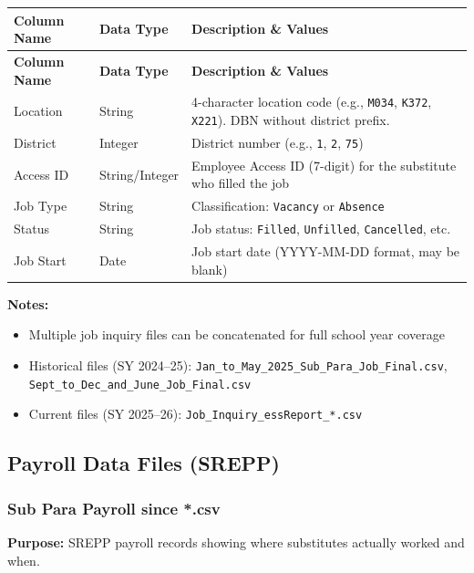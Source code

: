 \documentclass[12pt,letterpaper]{article}
\begin{document}
\begin{longtable}{p{3.5cm}p{2.5cm}p{7cm}}
\toprule
\textbf{Column Name} & \textbf{Data Type} & \textbf{Description \& Values} \\
\midrule
\endfirsthead
\toprule
\textbf{Column Name} & \textbf{Data Type} & \textbf{Description \& Values} \\
\midrule
\endhead
Location & String & 4-character location code (e.g., \texttt{M034}, \texttt{K372}, \texttt{X221}). DBN without district prefix. \\
\midrule
District & Integer & District number (e.g., \texttt{1}, \texttt{2}, \texttt{75}) \\
\midrule
Access ID & String/Integer & Employee Access ID (7-digit) for the substitute who filled the job \\
\midrule
Job Type & String & Classification: \texttt{Vacancy} or \texttt{Absence} \\
\midrule
Status & String & Job status: \texttt{Filled}, \texttt{Unfilled}, \texttt{Cancelled}, etc. \\
\midrule
Job Start & Date & Job start date (YYYY-MM-DD format, may be blank) \\
\bottomrule
\end{longtable}

\textbf{Notes:}
\begin{itemize}[leftmargin=*]
    \item Multiple job inquiry files can be concatenated for full school year coverage
    \item Historical files (SY 2024--25): \texttt{Jan\_to\_May\_2025\_Sub\_Para\_Job\_Final.csv},\\
          \texttt{Sept\_to\_Dec\_and\_June\_Job\_Final.csv}
    \item Current files (SY 2025--26): \texttt{Job\_Inquiry\_essReport\_*.csv}
\end{itemize}

\subsection{Payroll Data Files (SREPP)}

\subsubsection{Sub Para Payroll since *.csv}

\textbf{Purpose:} SREPP payroll records showing where substitutes actually worked and when.
\end{document}
